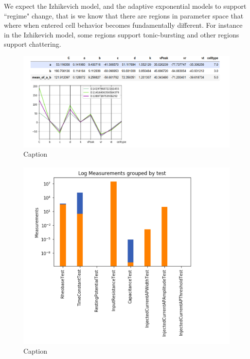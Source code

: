 
We expect the Izhikevich model, and the adaptive exponential models to support ``regime" change, that is we know that there are regions in parameter space that where when entered cell behavior becomes fundamentally different. For instance in the Izhikevich model, some regions support tonic-bursting and other regions support chattering. 

\begin{figure}
    \centering
    \includegraphics{figures/mean_model_mean_measure_ment_params.png}
    \caption{Caption}
    \label{fig:my_label}
\end{figure}

\begin{figure}
    \centering
    \includegraphics{figures/mean_model_mean_test.png}
    \caption{Caption}
    \label{fig:my_label}
\end{figure}

